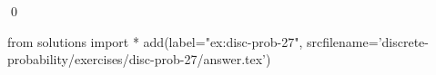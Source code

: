 
\begin{ex} 
  \label{ex:disc-prob-27}
  
  \qed
\end{ex} 
\begin{python0}
from solutions import *
add(label="ex:disc-prob-27",
    srcfilename='discrete-probability/exercises/disc-prob-27/answer.tex') 
\end{python0}
